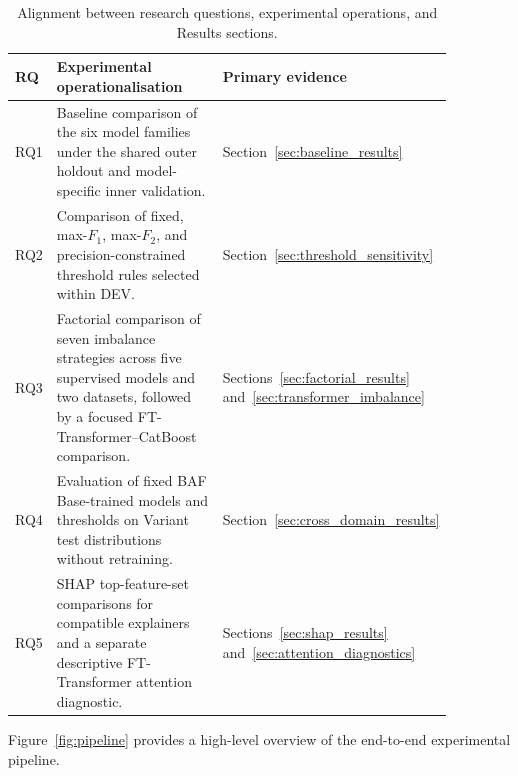 \begin{table}[htbp]
\centering
\small
\caption{Alignment between research questions, experimental operations, and Results sections.}
\label{tab:rq_design_map}
\begin{tabular}{p{0.08\linewidth} p{0.52\linewidth} p{0.27\linewidth}}
\toprule
\textbf{RQ} & \textbf{Experimental operationalisation} & \textbf{Primary evidence} \\
\midrule
RQ1 & Baseline comparison of the six model families under the shared outer holdout and model-specific inner validation. & Section~\ref{sec:baseline_results} \\
RQ2 & Comparison of fixed, max-$F_1$, max-$F_2$, and precision-constrained threshold rules selected within DEV. & Section~\ref{sec:threshold_sensitivity} \\
RQ3 & Factorial comparison of seven imbalance strategies across five supervised models and two datasets, followed by a focused FT-Transformer--CatBoost comparison. & Sections~\ref{sec:factorial_results} and~\ref{sec:transformer_imbalance} \\
RQ4 & Evaluation of fixed BAF Base-trained models and thresholds on Variant test distributions without retraining. & Section~\ref{sec:cross_domain_results} \\
RQ5 & SHAP top-feature-set comparisons for compatible explainers and a separate descriptive FT-Transformer attention diagnostic. & Sections~\ref{sec:shap_results} and~\ref{sec:attention_diagnostics} \\
\bottomrule
\end{tabular}
\end{table}

Figure~\ref{fig:pipeline} provides a high-level overview of the end-to-end experimental pipeline.



